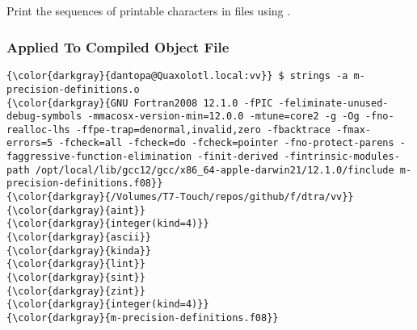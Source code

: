% 

\subsection{\strings}
\label{sec:strings}

Print the sequences of printable characters in files using \strings.

		\subsubsection{Applied To Compiled Object File}
{\footnotesize{
\begin{Verbatim}[commandchars=\\\{\}]
{\color{darkgray}{dantopa@Quaxolotl.local:vv}} $ strings -a m-precision-definitions.o
{\color{darkgray}{GNU Fortran2008 12.1.0 -fPIC -feliminate-unused-debug-symbols -mmacosx-version-min=12.0.0 -mtune=core2 -g -Og -fno-realloc-lhs -ffpe-trap=denormal,invalid,zero -fbacktrace -fmax-errors=5 -fcheck=all -fcheck=do -fcheck=pointer -fno-protect-parens -faggressive-function-elimination -finit-derived -fintrinsic-modules-path /opt/local/lib/gcc12/gcc/x86_64-apple-darwin21/12.1.0/finclude m-precision-definitions.f08}}
{\color{darkgray}{/Volumes/T7-Touch/repos/github/f/dtra/vv}}
{\color{darkgray}{aint}}
{\color{darkgray}{integer(kind=4)}}
{\color{darkgray}{ascii}}
{\color{darkgray}{kinda}}
{\color{darkgray}{lint}}
{\color{darkgray}{sint}}
{\color{darkgray}{zint}}
{\color{darkgray}{integer(kind=4)}}
{\color{darkgray}{m-precision-definitions.f08}}
\end{Verbatim}
}}


